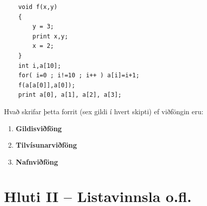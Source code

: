 \documentclass{article}
\newcommand{\bo}[1]{\textbf{#1}}
\newcommand{\enum}{\begin{enumerate}[label = \alph*.]}
\begin{document}
\begin{verbatim}
    void f(x,y)
    {
        y = 3;
        print x,y;
        x = 2;
    }
    int i,a[10];
    for( i=0 ; i!=10 ; i++ ) a[i]=i+1;
    f(a[a[0]],a[0]);
    print a[0], a[1], a[2], a[3];
\end{verbatim}
Hvað skrifar þetta forrit (sex gildi í hvert skipti) ef viðföngin eru:

\enum
\item \bo{Gildisviðföng }
\item \bo{Tilvísunarviðföng }
\item \bo{Nafnviðföng}
\end{enumerate}

\newpage
\section{Hluti II – Listavinnsla o.fl.}
\end{document}
